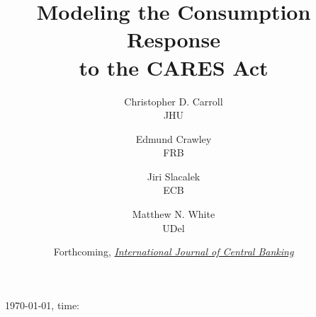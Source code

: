 \documentclass[titlepage,letterpaper]{\econtex}
\providecommand{\versn}{}
\renewcommand{\forcedate}{Forthcoming, \href{https://www.ijcb.org/}{\textit{International Journal of Central Banking}}}
\begin{document}
\hfill{\tiny \jobname~\versn~\today, time:\DTMcurrenttime}

\title{Modeling the Consumption Response\\ to the CARES Act}

{%
  \author{
    Christopher D. Carroll\authNum \\ {\small JHU}
    \and
    Edmund Crawley\authNum   \\ {\small FRB}
    \and
    Jiri Slacalek\authNum    \\ {\small ECB}
    \and
    Matthew N. White\authNum \\ {\small UDel}
  }
} %

  
\date{\forcedate}
\maketitle

\hypertarget{links}{}

\newcommand{\dashtarg}{Live Dashboard}
\newcommand{\htmltarg}{econ-ark.github.io/Pandemic}
\newcommand{\githtarg}{github.com/econ-ark/Pandemic}
\newcommand{\zipftarg}{zip~file:~~root~of~repo}
\newcommand{\latetarg}{LaTeX~directory~in~repo}
\newcommand{\subttarg}{LaTeX~directory~in~repo}

\newcommand{\githrepo}{\href{https://github.com/econ-ark/Pandemic}{\githtarg}}
\newcommand{\githtext}{Full codebase: Modify combos of assumptions}
\newcommand{\zipftext}{contains full replication files (code+text)}
\newcommand{\dashlive}{\href{https://econ-ark.org/materials/pandemic\#dashboard}{\dashtarg}}
\newcommand{\dashtext}{See effect of modifying main assumptions}
\newcommand{\htmlvers}{\href{https://econ-ark.github.io/Pandemic}{\htmltarg}}
\newcommand{\htmltext}{HTML version of paper}
\newcommand{\pdfltsub}{\href{https://github.com/econ-ark/Pandemic/blob/master/LaTeX/ConsumptionResponse.pdf}{\latetarg}}
\newcommand{\pdflttxt}{PDF~version~of~paper}
\newcommand{\slidesub}{\href{https://github.com/econ-ark/Pandemic/blob/master/LaTeX/ConsumptionResponse-Slides.pdf}{\subttarg}}
\newcommand{\slidetxt}{Presentation slides}
\newcommand{\bibtlink}{\href{https://raw.githubusercontent.com/econ-ark/Pandemic/gh-pages/LaTeX/ConsumptionResponse-Self.bib}{\subttarg}}
\newcommand{\bibttext}{Preferred BibTeX citation}
\newcommand{\zipflink}{\href{https://github.com/econ-ark/Pandemic/raw/master/ConsumptionResponse.zip  }{\zipftarg}}
\end{document}
